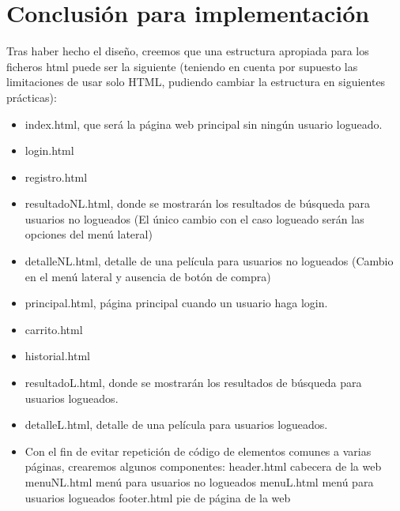 \documentclass[]{article}
\begin{document}
\section{Conclusión para implementación}
Tras haber hecho el diseño, creemos que una estructura apropiada para los ficheros html puede ser la siguiente (teniendo en cuenta por supuesto las limitaciones de usar solo HTML, pudiendo cambiar la estructura en siguientes prácticas):
\begin{itemize}
	\item index.html, que será la página web principal sin ningún usuario logueado.
	\item login.html
	\item registro.html
	\item resultadoNL.html, donde se mostrarán los resultados de búsqueda para usuarios no logueados (El único cambio con el caso logueado serán las opciones del menú lateral)
	\item detalleNL.html, detalle de una película para usuarios no logueados (Cambio en el menú lateral y ausencia de botón de compra)
	\item principal.html, página principal cuando un usuario haga login.
	\item carrito.html
	\item historial.html
	\item resultadoL.html, donde se mostrarán los resultados de búsqueda para usuarios logueados.
	\item detalleL.html, detalle de una película para usuarios logueados.
	\item Con el fin de evitar repetición de código de elementos comunes a varias páginas, crearemos algunos componentes:
	\subitem header.html cabecera de la web
	\subitem menuNL.html menú para usuarios no logueados
	\subitem menuL.html menú para usuarios logueados
	\subitem footer.html pie de página de la web
\end{itemize}
\end{document}
